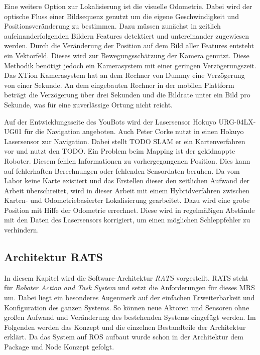 Eine weitere Option zur Lokalisierung ist die visuelle Odometrie. Dabei wird der optische Fluss einer Bildsequenz genutzt um die eigene Geschwindigkeit und Positionsveränderung zu bestimmen. Dazu müssen zunächst in zeitlich aufeinanderfolgenden Bildern Features detektiert und untereinander zugewiesen werden. Durch die Veränderung der Position auf dem Bild aller Features entsteht ein Vektorfeld. Dieses wird zur Bewegungsschätzung der Kamera genutzt. Diese Methodik benötigt jedoch ein Kamerasystem mit einer geringen Verzögerungszeit. Das XTion Kamerasystem hat an dem Rechner von Dummy eine Verzögerung von einer Sekunde. An dem eingebauten Rechner in der mobilen Plattform beträgt die Verzögerung über drei Sekunden und die Bildrate unter ein Bild pro Sekunde, was für eine zuverlässige Ortung nicht reicht.

Auf der Entwicklungsseite des YouBots wird der Lasersensor Hokuyo URG-04LX-UG01 für die Navigation angeboten. Auch Peter Corke nutzt in \cite[Kapitel 6]{Corke2011} einen Hokuyo Lasersensor zur Navigation. Dabei stellt TODO SLAM er ein Kartenverfahren vor und nutzt den TODO. Ein Problem beim Mapping ist der gekidnappte Roboter. Diesem fehlen Informationen zu vorhergegangenen Position. Dies kann auf fehlerhaften Berechnungen oder fehlenden Sensordaten beruhen. Da vom Labor keine Karte existiert und das Erstellen dieser den zeitlichen Aufwand der Arbeit überschreitet, wird in dieser Arbeit mit einem Hybridverfahren zwischen Karten- und Odometriebasierter Lokalisierung gearbeitet. Dazu wird eine grobe Position mit Hilfe der Odometrie errechnet. Diese wird in regelmäßigen Abstände mit den Daten des Lasersensors korrigiert, um einen möglichen Schleppfehler zu verhindern.

\subsection{Architektur RATS}
In diesem Kapitel wird die Software-Architektur \textit{RATS} vorgestellt. RATS steht für \textit{Roboter Action and Task System} und setzt die Anforderungen für dieses MRS um. Dabei liegt ein besonderes Augenmerk auf der einfachen Erweiterbarkeit und Konfiguration des ganzen Systems. So können neue Aktoren und Sensoren ohne großen Aufwand und Veränderung des bestehenden Systems eingefügt werden. Im Folgenden werden das Konzept und die einzelnen Bestandteile der Architektur erklärt. Da das System auf ROS aufbaut wurde schon in der Architektur dem Package und Node Konzept gefolgt.

